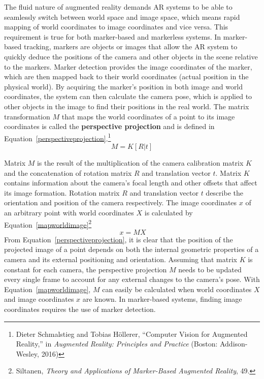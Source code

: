 The fluid nature of augmented reality demands AR systems to be able to seamlessly switch between world space and image space, which means rapid mapping of world coordinates to image coordinates and vice versa. This requirement is true for both marker-based and markerless systems. In marker-based tracking, markers are objects or images that allow the AR system to quickly deduce the positions of the camera and other objects in the scene relative to the markers. Marker detection provides the image coordinates of the marker, which are then mapped back to their world coordinates (actual position in the physical world). By acquiring the marker’s position in both image and world coordinates, the system can then calculate the camera pose, which is applied to other objects in the image to find their positions in the real world. The matrix transformation $M$ that maps the world coordinates of a point to its image coordinates is called the \textbf{perspective projection} and is defined in Equation~\ref{perspectiveprojection}.\footnote{Dieter Schmalstieg and Tobias Höllerer, “Computer Vision for Augmented Reality,” in \textit{Augmented Reality: Principles and Practice} (Boston: Addison-Wesley, 2016)}
\begin{equation}\label{perspectiveprojection}
M = K [R | t]
\end{equation}

Matrix $M$ is the result of the multiplication of the camera calibration matrix $K$ and the concatenation of rotation matrix $R$ and translation vector $t$. Matrix $K$ contains information about the camera's focal length and other offsets that affect its image formation. Rotation matrix $R$ and translation vector $t$ describe the orientation and position of the camera respectively. The image coordinates $x$ of an arbitrary point with world coordinates $X$ is calculated by Equation~\ref{mapworldimage}\footnote{Siltanen, \textit{Theory and Applications of Marker-Based Augmented Reality}, 49.}
\begin{equation}\label{mapworldimage}\
x = MX
\end{equation}
From Equation~\ref{perspectiveprojection}, it is clear that the position of the projected image of a point depends on both the internal geometric properties of a camera and its external positioning and orientation. Assuming that matrix $K$ is constant for each camera, the perspective projection $M$ needs to be updated every single frame to account for any external changes to the camera's pose. With Equation~\ref{mapworldimage}, $M$ can easily be calculated when world coordinates $X$ and image coordinates $x$ are known. In marker-based systems, finding image coordinates requires the use of marker detection.

